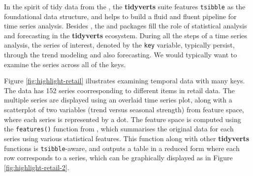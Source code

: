 In the spirit of tidy data from the 
\citep{Wickham2019}, the \textbf{tidyverts} suite features
\texttt{tsibble} as the foundational data structure, and helps to build
a fluid and fluent pipeline for time series analysis. Besides
, the  \citep{R-feasts} and
 \citep{R-fable} packages fill the role of statistical
analysis and forecasting in the \textbf{tidyverts} ecosystem. During all
the steps of a time series analysis, the series of interest, denoted by
the \texttt{key} variable, typically persist, through the trend modeling
and also forecasting. We would typically want to examine the series
across all of the keys.

Figure \ref{fig:highlight-retail} illustrates examining temporal data
with many keys. The data has 152 series coorresponding to different
items in retail data. The multiple series are displayed using an
overlaid time series plot, along with a scatterplot of two variables
(trend versus seasonal strength) from feature space, where each series
is represented by a dot. The feature space is computed using the
\texttt{features()} function from , which summarises the
original data for each series using various statistical features. This
function along with other \textbf{tidyverts} functions is
\texttt{tsibble}-aware, and outputs a table in a reduced form where each
row corresponds to a series, which can be graphically displayed as in
Figure \ref{fig:highlight-retail-2}.


